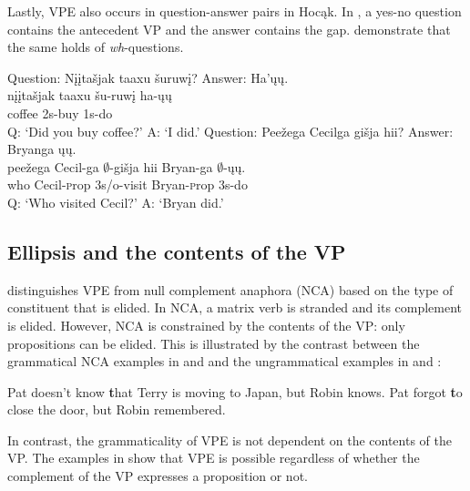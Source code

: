 \documentclass[output=paper]{LSP/langsci}
\begin{document}
Lastly, VPE also occurs in question-answer pairs in Hocąk. In , a yes-no question contains the antecedent VP and the answer contains the gap.  demonstrate that the same holds of \emph{wh}-questions.
 
\ea\label{ex:johnson:28}
\ea\label{ex:johnson:28a} 
\glll Question: {Nįįtašjak taaxu} šuruwį? Answer: Ha'ųų.\\
{} {nįįtašjak taaxu} šu-ruwį {} ha-ųų\\
{} coffee {\textsc 2s}-buy {} {\textsc 1s}-do\\
 \trans Q: `Did you buy coffee?' A: `I did.' 
\ex\label{ex:johnson:28b} 
\glll Question: Peežega Cecilga {gišja hii}? Answer: Bryanga ųų.\\
{} peežega Cecil-ga $\emptyset$-{gišja hii} {} Bryan-ga $\emptyset$-ųų.\\
{} who Cecil-{\textsc prop} {\textsc 3s/o}-visit {} Bryan-{\textsc prop} {\textsc 3s}-do\\
\trans Q: `Who visited Cecil?' A: `Bryan did.'
\z
\z


\subsection{Ellipsis and the contents of the VP}\label{sec:johnson:3.2}

\citet{Goldberg2005} distinguishes VPE from null complement anaphora (NCA) based on the type of constituent that is elided. In NCA, a matrix verb is stranded and its complement is elided. However, NCA is constrained by the contents of the VP: only propositions can be elided. This is illustrated by the contrast between the grammatical NCA examples in  and  and the ungrammatical examples in  and :
 
\ea\label{ex:johnson:29}
\ea\label{ex:johnson:29a} 
Pat doesn't know {\textbf that Terry is moving to Japan}, but Robin knows.
\label{ex:johnson:29b}
\ex\label{ex:johnson:29c}
Pat forgot {\textbf to close the door}, but Robin remembered.
\label{ex:johnson:29d}
\z
\z

In contrast, the grammaticality of VPE is not dependent on the contents of the VP. The examples in  show that VPE is possible regardless of whether the complement of the VP expresses a proposition or not.
 
\end{document}
